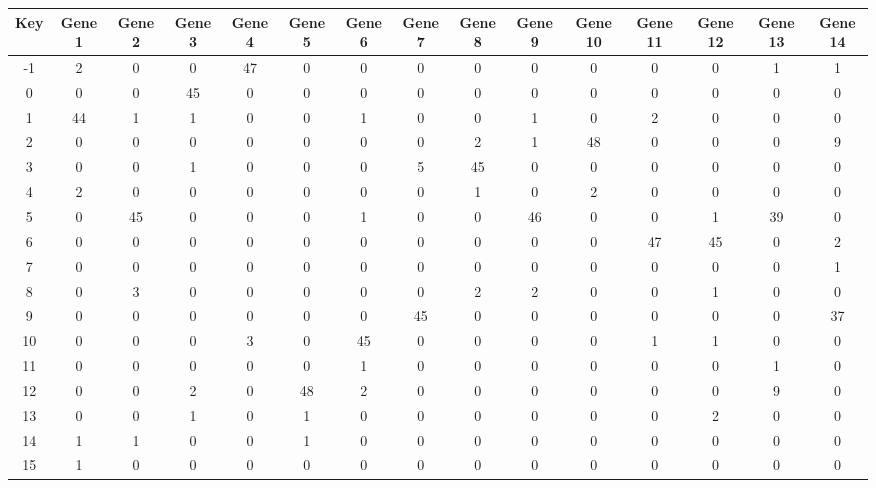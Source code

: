\begin{tabular}{|c|c|c|c|c|c|c|c|c|c|c|c|c|c|c|}
\hline
Key & Gene 1 & Gene 2 & Gene 3 & Gene 4 & Gene 5 & Gene 6 & Gene 7 & Gene 8 & Gene 9 & Gene 10 & Gene 11 & Gene 12 & Gene 13 & Gene 14 \\
\hline
-1 & 2 & 0 & 0 & 47 & 0 & 0 & 0 & 0 & 0 & 0 & 0 & 0 & 1 & 1 \\
0 & 0 & 0 & 45 & 0 & 0 & 0 & 0 & 0 & 0 & 0 & 0 & 0 & 0 & 0 \\
1 & 44 & 1 & 1 & 0 & 0 & 1 & 0 & 0 & 1 & 0 & 2 & 0 & 0 & 0 \\
2 & 0 & 0 & 0 & 0 & 0 & 0 & 0 & 2 & 1 & 48 & 0 & 0 & 0 & 9 \\
3 & 0 & 0 & 1 & 0 & 0 & 0 & 5 & 45 & 0 & 0 & 0 & 0 & 0 & 0 \\
4 & 2 & 0 & 0 & 0 & 0 & 0 & 0 & 1 & 0 & 2 & 0 & 0 & 0 & 0 \\
5 & 0 & 45 & 0 & 0 & 0 & 1 & 0 & 0 & 46 & 0 & 0 & 1 & 39 & 0 \\
6 & 0 & 0 & 0 & 0 & 0 & 0 & 0 & 0 & 0 & 0 & 47 & 45 & 0 & 2 \\
7 & 0 & 0 & 0 & 0 & 0 & 0 & 0 & 0 & 0 & 0 & 0 & 0 & 0 & 1 \\
8 & 0 & 3 & 0 & 0 & 0 & 0 & 0 & 2 & 2 & 0 & 0 & 1 & 0 & 0 \\
9 & 0 & 0 & 0 & 0 & 0 & 0 & 45 & 0 & 0 & 0 & 0 & 0 & 0 & 37 \\
10 & 0 & 0 & 0 & 3 & 0 & 45 & 0 & 0 & 0 & 0 & 1 & 1 & 0 & 0 \\
11 & 0 & 0 & 0 & 0 & 0 & 1 & 0 & 0 & 0 & 0 & 0 & 0 & 1 & 0 \\
12 & 0 & 0 & 2 & 0 & 48 & 2 & 0 & 0 & 0 & 0 & 0 & 0 & 9 & 0 \\
13 & 0 & 0 & 1 & 0 & 1 & 0 & 0 & 0 & 0 & 0 & 0 & 2 & 0 & 0 \\
14 & 1 & 1 & 0 & 0 & 1 & 0 & 0 & 0 & 0 & 0 & 0 & 0 & 0 & 0 \\
15 & 1 & 0 & 0 & 0 & 0 & 0 & 0 & 0 & 0 & 0 & 0 & 0 & 0 & 0 \\
\hline
\end{tabular}